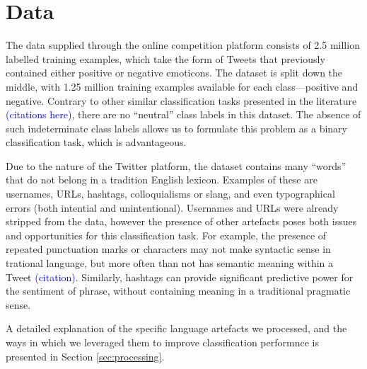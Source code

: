 \section{Data}
\label{sec:data}

The data supplied through the online competition platform consists of 2.5 million labelled training examples, which take the form of Tweets that previously contained either positive or negative emoticons. The dataset is split down the middle, with 1.25 million training examples available for each class---positive and negative. Contrary to other similar classification tasks presented in the literature \textcolor{blue}{(citations here)}, there are no ``neutral'' class labels in this dataset. The absence of such indeterminate class labels allows us to formulate this problem as a binary classification task, which is advantageous.

Due to the nature of the Twitter platform, the dataset contains many ``words'' that do not belong in a tradition English lexicon. Examples of these are usernames, URLs, hashtags, colloquialisms or slang, and even typographical errors (both intential and unintentional). Usernames and URLs were already stripped from the data, however the presence of other artefacts poses both issues and opportunities for this classification task. For example, the presence of repeated punctuation marks or characters may not make syntactic sense in trational language, but more often than not has semantic meaning within a Tweet \textcolor{blue}{(citation)}. Similarly, hashtags can provide significant predictive power for the sentiment of phrase, without containing meaning in a traditional pragmatic sense.

A detailed explanation of the specific language artefacts we processed, and the ways in which we leveraged them to improve classification performnce is presented in Section \ref{sec:processing}.

